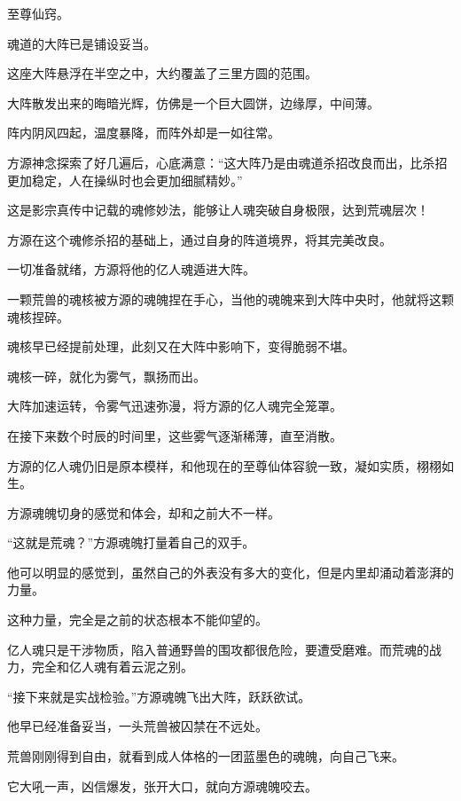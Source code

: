 
\begin{this_body}

至尊仙窍。

魂道的大阵已是铺设妥当。

这座大阵悬浮在半空之中，大约覆盖了三里方圆的范围。

大阵散发出来的晦暗光辉，仿佛是一个巨大圆饼，边缘厚，中间薄。

阵内阴风四起，温度暴降，而阵外却是一如往常。

方源神念探索了好几遍后，心底满意：“这大阵乃是由魂道杀招改良而出，比杀招更加稳定，人在操纵时也会更加细腻精妙。”

这是影宗真传中记载的魂修妙法，能够让人魂突破自身极限，达到荒魂层次！

方源在这个魂修杀招的基础上，通过自身的阵道境界，将其完美改良。

一切准备就绪，方源将他的亿人魂遁进大阵。

一颗荒兽的魂核被方源的魂魄捏在手心，当他的魂魄来到大阵中央时，他就将这颗魂核捏碎。

魂核早已经提前处理，此刻又在大阵中影响下，变得脆弱不堪。

魂核一碎，就化为雾气，飘扬而出。

大阵加速运转，令雾气迅速弥漫，将方源的亿人魂完全笼罩。

在接下来数个时辰的时间里，这些雾气逐渐稀薄，直至消散。

方源的亿人魂仍旧是原本模样，和他现在的至尊仙体容貌一致，凝如实质，栩栩如生。

方源魂魄切身的感觉和体会，却和之前大不一样。

“这就是荒魂？”方源魂魄打量着自己的双手。

他可以明显的感觉到，虽然自己的外表没有多大的变化，但是内里却涌动着澎湃的力量。

这种力量，完全是之前的状态根本不能仰望的。

亿人魂只是干涉物质，陷入普通野兽的围攻都很危险，要遭受磨难。而荒魂的战力，完全和亿人魂有着云泥之别。

“接下来就是实战检验。”方源魂魄飞出大阵，跃跃欲试。

他早已经准备妥当，一头荒兽被囚禁在不远处。

荒兽刚刚得到自由，就看到成人体格的一团蓝墨色的魂魄，向自己飞来。

它大吼一声，凶信爆发，张开大口，就向方源魂魄咬去。


\end{this_body}
